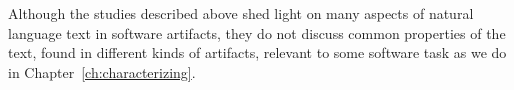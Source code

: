 Although the studies described above shed light on many 
aspects of natural language text in software artifacts, 
they do not discuss common properties of the text, 
found in different kinds of artifacts, 
relevant to some software task as we do in Chapter~\ref{ch:characterizing}.





















